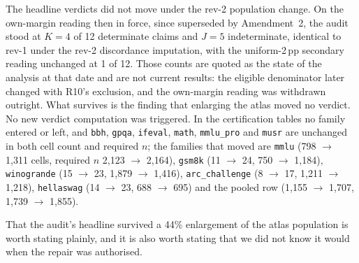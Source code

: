 The headline verdicts did not move under the rev-2 population change. On the
own-margin reading then in force, since superseded by Amendment~2, the audit
stood at $K = 4$ of 12 determinate claims and $J = 5$ indeterminate, identical
to rev-1 under the rev-2 discordance imputation, with the uniform-2\,pp
secondary reading unchanged at 1 of 12. Those counts are quoted as the state of
the analysis at that date and are not current results: the eligible denominator
later changed with R10's exclusion, and the own-margin reading was withdrawn
outright. What survives is the finding that enlarging the atlas moved no
verdict. No new verdict computation was triggered. In the
certification tables no family entered or left, and \texttt{bbh}, \texttt{gpqa},
\texttt{ifeval}, \texttt{math}, \texttt{mmlu\_pro} and \texttt{musr} are
unchanged in both cell count and required $n$; the families that moved are
\texttt{mmlu} (798 $\to$ 1{,}311 cells, required $n$ 2{,}123 $\to$ 2{,}164),
\texttt{gsm8k} (11 $\to$ 24, 750 $\to$ 1{,}184), \texttt{winogrande}
(15 $\to$ 23, 1{,}879 $\to$ 1{,}416), \texttt{arc\_challenge} (8 $\to$ 17,
1{,}211 $\to$ 1{,}218), \texttt{hellaswag} (14 $\to$ 23, 688 $\to$ 695) and the
pooled row (1{,}155 $\to$ 1{,}707, 1{,}739 $\to$ 1{,}855).

That the audit's headline survived a 44\% enlargement of the atlas population is
worth stating plainly, and it is also worth stating that we did not know it
would when the repair was authorised.
